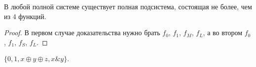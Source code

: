 \begin{corollary}
    В любой полной системе существует полная подсистема, состоящая не более, чем из 4 функций.
\end{corollary}

\begin{proof}
    В первом случае доказательства нужно брать $f_0$, $f_1$, $f_M$, $f_L$, а во втором $f_0$, $f_1$, $f_S$, $f_L$.
\end{proof}

\begin{example}
    $\{0, 1, x \oplus y \oplus z, x \& y\}$.
\end{example}